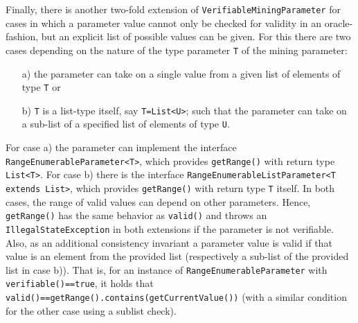 \documentclass{scrartcl}
\newcommand{\class}[1]{\texttt{#1}}
\begin{document}
Finally, there is another two-fold extension of
\class{VerifiableMiningParameter} for cases in which a parameter value cannot only be checked for validity in an
oracle-fashion, but an explicit list of possible values can be given. For this
there are two cases depending on the nature of the type parameter
\class{T} of the mining parameter: 
\begin{itemize}
\item[a)] the parameter can take on a single value from a given list of elements
of type \class{T} or
\item[b)] \class{T} is a
list-type itself, say \class{T=List<U>}; such that the parameter can take on a sub-list of a specified list of elements of type \class{U}.
\end{itemize}
 For case a) the parameter can implement the interface
 \class{RangeEnumerableParameter<T>}, which provides \class{getRange()} with
 return type \class{List<T>}.
 For case b) there is the interface
 \class{RangeEnumerableListParameter<T extends List>}, which provides
 \class{getRange()} with return type \class{T} itself.
 In both cases, the range of valid values can depend on other parameters.
 Hence, \class{getRange()} has the same behavior as \class{valid()} and throws
 an \class{IllegalStateException} in both extensions if the parameter is not verifiable.
 Also, as an additional consistency invariant a
 parameter value is valid if that value is an element from the
 provided list (respectively a sub-list of the provided list in case
 b)). That is, for an instance of \class{RangeEnumerableParameter} with
 \class{verifiable()==true}, it holds that
 \class{valid()==getRange().contains(getCurrentValue())} (with a similar condition for the other case using a sublist check).
\end{document}
